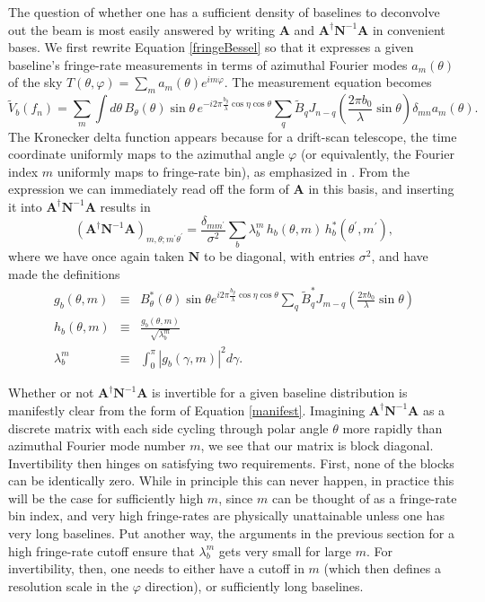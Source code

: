 \documentclass[twocolumn,apj,numberedappendix]{emulateapj}
\newcommand{\A}{\mathbf{A}}
\newcommand{\N}{\mathbf{N}}
\begin{document}
The question of whether one has a sufficient density of baselines to deconvolve
out the beam is most easily answered by writing $\A$ and $\A^\dagger \N^{-1}
\A$ in convenient bases.  We first rewrite Equation \eqref{fringeBessel} so
that it expresses a given baseline's fringe-rate measurements in terms of
azimuthal Fourier modes $a_m(\theta)$ of the sky $T(\theta, \varphi) = \sum_m
a_m(\theta) e^{i m \varphi}$.  The measurement equation becomes
\begin{equation}
\label{eq:convenientBasis}
\widetilde{V}_b (f_n) = \sum_m \int d\theta \, B_\theta (\theta) \sin \theta  \, e^{-i 2 \pi  \frac{b_y}{\lambda} \cos \eta \cos \theta}  \sum_q \widetilde{B}_q  J_{n-q} \left( \frac{2 \pi b_0}{\lambda} \sin \theta \right) \delta_{mn} a_m (\theta).
\end{equation}
The Kronecker delta function appears because for a drift-scan telescope, the
time coordinate uniformly maps to the azimuthal angle $\varphi$ (or
equivalently, the Fourier index $m$ uniformly maps to fringe-rate bin), as
emphasized in \cite{Shaw2013}.  From the expression we can immediately read off
the form of $\A$ in this basis, and inserting it into $\A^\dagger \N^{-1} \A$
results in
\begin{equation}
\label{manifest}
\left( \A^\dagger \N^{-1} \A \right)_{m, \theta ; m^\prime \theta^\prime} = \frac{\delta_{m m^\prime}}{\sigma^2} \sum_b \lambda_b^m \, h_b(\theta, m) \, h_{b}^*(\theta^\prime, m^\prime),
\end{equation}
where we have once again taken $\N$ to be diagonal, with entries $\sigma^2$, and have made the definitions
\begin{eqnarray}
g_b(\theta, m) &\equiv& B_\theta^*(\theta) \sin \theta e^{i 2 \pi  \frac{b_y}{\lambda} \cos \eta \cos \theta}  \sum_q \widetilde{B}^*_q  J_{m-q} \left( \frac{2 \pi b_0}{\lambda} \sin \theta \right) \\
h_b ( \theta, m) &\equiv& \frac{g_b (\theta, m)}{\sqrt{\lambda_b^m}} \\
\lambda_b^m &\equiv&  \int_0^\pi |g_b (\gamma, m) |^2 d\gamma .
\end{eqnarray}

Whether or not $\A^\dagger \N^{-1} \A$ is invertible for a given baseline
distribution is manifestly clear from the form of Equation \eqref{manifest}.
Imagining $\A^\dagger \N^{-1} \A$ as a discrete matrix with each side cycling
through polar angle $\theta$ more rapidly than azimuthal Fourier mode number
$m$, we see that our matrix is block diagonal.  Invertibility then hinges on
satisfying two requirements.  First, none of the blocks can be identically
zero.  While in principle this can never happen, in practice this will be the
case for sufficiently high $m$, since $m$ can be thought of as a fringe-rate
bin index, and very high fringe-rates are physically unattainable unless one
has very long baselines.  Put another way, the arguments in the previous
section for a high fringe-rate cutoff ensure that $\lambda_b^m$ gets very small
for large $m$.  For invertibility, then, one needs to either have a cutoff in
$m$ (which then defines a resolution scale in the $\varphi$ direction), or
sufficiently long baselines.
\end{document}
